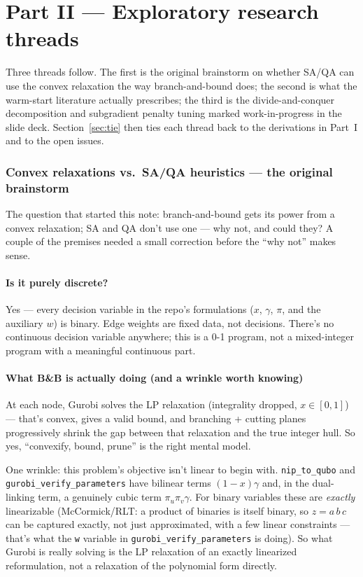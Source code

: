 \documentclass[11pt]{article}
\newcommand{\code}[1]{\texttt{#1}}
\begin{document}
\part*{Part II --- Exploratory research threads}

Three threads follow. The first is the original brainstorm on whether SA/QA can use the convex relaxation the way branch-and-bound does; the second is what the warm-start literature actually prescribes; the third is the divide-and-conquer decomposition and subgradient penalty tuning marked work-in-progress in the slide deck. Section~\ref{sec:tie} then ties each thread back to the derivations in Part~I and to the open issues.

\section{Convex relaxations vs.\ SA/QA heuristics --- the original brainstorm}

The question that started this note: branch-and-bound gets its power from a convex relaxation; SA and QA don't use one --- why not, and could they? A couple of the premises needed a small correction before the ``why not'' makes sense.

\subsection*{Is it purely discrete?}

Yes --- every decision variable in the repo's formulations ($x$, $\gamma$, $\pi$, and the auxiliary $w$) is binary. Edge weights are fixed data, not decisions. There's no continuous decision variable anywhere; this is a 0-1 program, not a mixed-integer program with a meaningful continuous part.

\subsection*{What B\&B is actually doing (and a wrinkle worth knowing)}

At each node, Gurobi solves the LP relaxation (integrality dropped, $x \in [0,1]$) --- that's convex, gives a valid bound, and branching + cutting planes progressively shrink the gap between that relaxation and the true integer hull. So yes, ``convexify, bound, prune'' is the right mental model.

One wrinkle: this problem's objective isn't linear to begin with. \code{nip\_to\_qubo} and \code{gurobi\_verify\_parameters} have bilinear terms $(1-x)\gamma$ and, in the dual-linking term, a genuinely cubic term $\pi_u \pi_v \gamma$. For binary variables these are \emph{exactly} linearizable (McCormick/RLT: a product of binaries is itself binary, so $z = a\,b\,c$ can be captured exactly, not just approximated, with a few linear constraints --- that's what the \code{w} variable in \code{gurobi\_verify\_parameters} is doing). So what Gurobi is really solving is the LP relaxation of an exactly linearized reformulation, not a relaxation of the polynomial form directly.
\end{document}
